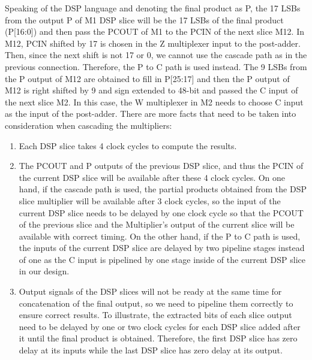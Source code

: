 Speaking of the DSP language and denoting the final product as P, the 17 LSBs from the output P of M1 DSP slice will be the 17 LSBs of the final product (P[16:0]) and then pass the PCOUT of M1  to the PCIN of the next slice M12.
In M12, PCIN shifted by 17 is chosen in the Z multiplexer input to the post-adder. 
Then, since the next shift is not 17 or 0, we cannot use the cascade path as in the previous connection.
Therefore, the P to C path is used instead. 
The 9 LSBs from the P output of M12 are obtained to fill in P[25:17] and then the P output of M12 is right shifted by 9 and sign extended to 48-bit and passed the C input of the next slice M2.
In this case, the W multiplexer in M2 needs to choose C input as the input of the post-adder. 
There are more facts that need to be taken into consideration when cascading the multipliers: 
\begin{enumerate}
   
    \item Each DSP slice takes 4 clock cycles to compute the results.
    \item The PCOUT and P outputs of the previous DSP slice, and thus the PCIN of the current DSP slice will be available after these 4 clock cycles. 
    On one hand, if the cascade path is used, the partial products obtained from the DSP slice multiplier will be available after 3 clock cycles, so the input of the current DSP slice needs to be delayed by one clock cycle so that the PCOUT of the previous slice and the Multiplier’s output of the current slice will be available with correct timing. 
    On the other hand, if the P to C path is used, the inputs of the current DSP slice are delayed by two pipeline stages instead of one as the C input is pipelined by one stage inside of the current DSP slice in our design.
     \item Output signals of the DSP slices will not be ready at the same time for concatenation of the final output, so we need to pipeline them correctly to ensure correct results.
     To illustrate, the extracted bits of each slice output need to be delayed by one or two clock cycles for each  DSP slice added after it until the final product is obtained. 
     Therefore, the first DSP slice has zero delay at its inputs while the last DSP slice has zero delay at its output. 
\end{enumerate}




